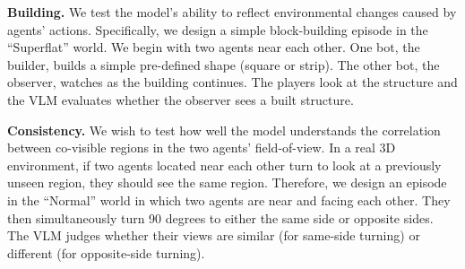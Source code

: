 \textbf{Building.} We test the model's ability to reflect environmental changes caused by agents' actions. Specifically, we design a simple block-building episode in the ``Superflat'' world. We begin with two agents near each other. One bot, the builder, builds a simple pre-defined shape (square or strip). The other bot, the observer, watches as the building continues. The players look at the structure and the VLM evaluates whether the observer sees a built structure.

\textbf{Consistency.} We wish to test how well the model understands the correlation between co-visible regions in the two agents' field-of-view. In a real 3D environment, if two agents located near each other turn to look at a previously unseen region, they should see the same region. Therefore, we design an episode in the ``Normal'' world in which two agents are near and facing each other. They then simultaneously turn 90 degrees to either the same side or opposite sides. The VLM judges whether their views are similar (for same-side turning) or different (for opposite-side turning).

